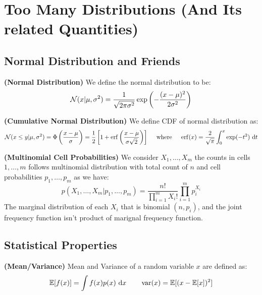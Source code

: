 \section{Too Many Distributions (And Its related Quantities)}

\subsection{Normal Distribution and Friends}

\begin{definition}{\textbf{(Normal Distribution)}}
    We define the normal distribution to be:
    \begin{equation*}
        \mathcal{N}(x | \mu, \sigma^2) = \frac{1}{\sqrt{2\pi\sigma^2}}\exp\left( -\frac{(x-\mu)^2}{2\sigma^2} \right)
    \end{equation*}
\end{definition}

\begin{definition}{\textbf{(Cumulative Normal Distribution)}}
    We define CDF of normal distribution as:
    \begin{equation*}
        \mathcal{N}(x \le y | \mu, \sigma^2) = \Phi\left( \frac{x-\mu}{\sigma} \right) = \frac{1}{2}\left[ 1 + \operatorname{erf}\left( \frac{x-\mu}{\sigma \sqrt{2}} \right) \right] \quad \text{ where } \quad \operatorname{erf}(x) = \frac{2}{\sqrt{\pi}}\int^x_0\exp(-t^2)\ \mathrm{d} t
    \end{equation*}
\end{definition}

\begin{definition}{\textbf{(Multinomial Cell Probabilities)}}
    We consider $X_1,\dots,X_m$ the counts in cells $1,\dots,m$ follows multinomial distribution with total count of $n$ and cell probabilities $p_1,\dots,p_m$ as we have:
    \begin{equation*}
        p(X_1,\dots,X_m |p_1,\dots,p_m) = \frac{n!}{\prod^m_{i=1} X_i!}\prod^m_{i=1}p_i^{X_i}
    \end{equation*}
    The marginal distribution of each $X_i$ that is binomial $(n,p_i)$, and the joint frequency function isn't product of marignal frequency function. 
\end{definition}

\subsection{Statistical Properties}

\begin{definition}{\textbf{(Mean/Variance)}}
    Mean and Variance of a random variable $x$ are defined as:
    \begin{equation*}
        \mathbb{E}[f(x)] = \int f(x)p(x)\ \mathrm{d} x \qquad \operatorname{var}(x) = \mathbb{E}[(x - \mathbb{E}[x])^2] 
    \end{equation*}
\end{definition}


